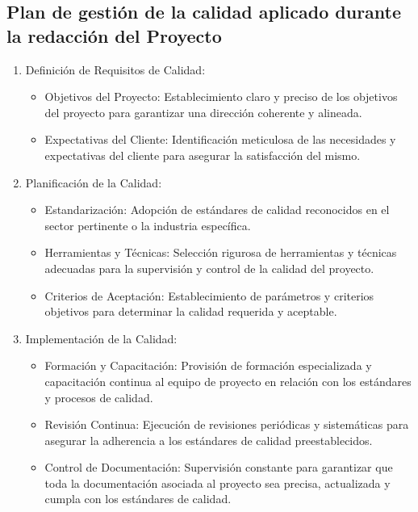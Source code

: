 \documentclass[../main.tex]{subfiles}
\begin{document}
\subsection{Plan de gestión de la calidad aplicado durante la redacción del Proyecto}
\begin{enumerate}
    \item Definición de Requisitos de Calidad:
    \begin{itemize}
        \item Objetivos del Proyecto: Establecimiento claro y preciso de los objetivos del proyecto para garantizar una dirección coherente y alineada.
        \item Expectativas del Cliente: Identificación meticulosa de las necesidades y expectativas del cliente para asegurar la satisfacción del mismo.
    \end{itemize}
    \item Planificación de la Calidad:
    \begin{itemize}
        \item Estandarización: Adopción de estándares de calidad reconocidos en el sector pertinente o la industria específica.
        \item Herramientas y Técnicas: Selección rigurosa de herramientas y técnicas adecuadas para la supervisión y control de la calidad del proyecto.
        \item Criterios de Aceptación: Establecimiento de parámetros y criterios objetivos para determinar la calidad requerida y aceptable.
    \end{itemize}
    \item Implementación de la Calidad:
    \begin{itemize}
        \item Formación y Capacitación: Provisión de formación especializada y capacitación continua al equipo de proyecto en relación con los estándares y procesos de calidad.
        \item Revisión Continua: Ejecución de revisiones periódicas y sistemáticas para asegurar la adherencia a los estándares de calidad preestablecidos.
        \item Control de Documentación: Supervisión constante para garantizar que toda la documentación asociada al proyecto sea precisa, actualizada y cumpla con los estándares de calidad.
    \end{itemize}

\end{enumerate}
\end{document}
